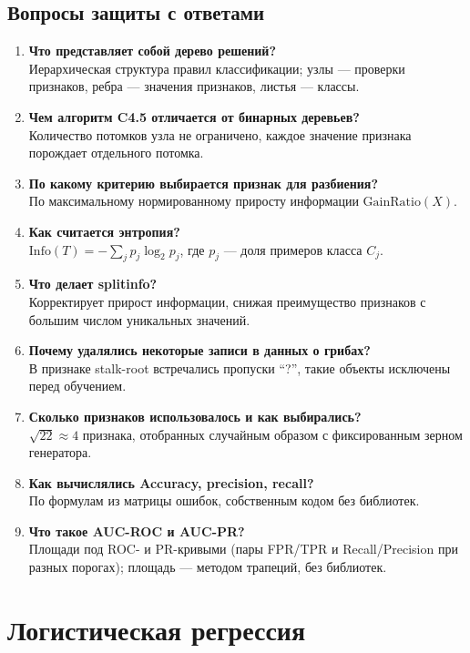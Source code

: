 \documentclass[12pt,a4paper]{article}
\begin{document}
\subsection{Вопросы защиты с ответами}
\begin{enumerate}
\item \textbf{Что представляет собой дерево решений?}\\
Иерархическая структура правил классификации; узлы --- проверки признаков, ребра --- значения признаков, листья --- классы.
\item \textbf{Чем алгоритм C4.5 отличается от бинарных деревьев?}\\
Количество потомков узла не ограничено, каждое значение признака порождает отдельного потомка.
\item \textbf{По какому критерию выбирается признак для разбиения?}\\
По максимальному нормированному приросту информации $\mathrm{GainRatio}(X)$.
\item \textbf{Как считается энтропия?}\\
$\mathrm{Info}(T) = -\sum_j p_j \log_2 p_j$, где $p_j$ --- доля примеров класса $C_j$.
\item \textbf{Что делает splitinfo?}\\
Корректирует прирост информации, снижая преимущество признаков с большим числом уникальных значений.
\item \textbf{Почему удалялись некоторые записи в данных о грибах?}\\
В признаке stalk-root встречались пропуски ``?'', такие объекты исключены перед обучением.
\item \textbf{Сколько признаков использовалось и как выбирались?}\\
$\sqrt{22} \approx 4$ признака, отобранных случайным образом с фиксированным зерном генератора.
\item \textbf{Как вычислялись Accuracy, precision, recall?}\\
По формулам из матрицы ошибок, собственным кодом без библиотек.
\item \textbf{Что такое AUC-ROC и AUC-PR?}\\
Площади под ROC- и PR-кривыми (пары FPR/TPR и Recall/Precision при разных порогах); площадь --- методом трапеций, без библиотек.
\end{enumerate}

\section{Логистическая регрессия}
\end{document}
